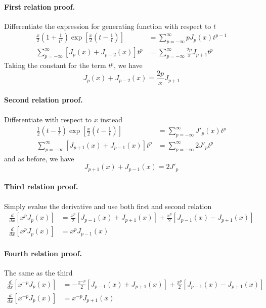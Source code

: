 \documentclass[../main.tex]{subfiles}
\begin{document}
\paragraph*{First relation proof.} Differentiate the expression for generating function with respect to $t$
\begin{align*}
    \frac{x}{2}\left(1+\frac{1}{t^2}\right)\exp\left[\frac{x}{2}\left(t-\frac{1}{t}\right)\right]&=\sum_{p=-\infty}^{\infty}pJ_p(x)t^{p-1}\\
    \sum_{p=-\infty}^{\infty}\left[J_p(x)+J_{p-2}(x)\right]t^p&= \sum_{p=-\infty}^{\infty}\frac{2p}{x}J_{p+1}t^{p}
\end{align*}
Taking the constant for the term $t^p$, we have 
\begin{equation*}
    J_p(x)+J_{p-2}(x)=\frac{2p}{x}J_{p+1} 
\end{equation*}

\paragraph*{Second relation proof.} Differentiate with respect to $x$ instead 
\begin{align*}
    \frac{1}{2}\left(t-\frac{1}{t}\right)\exp\left[\frac{x}{2}\left(t-\frac{1}{t}\right)\right]&=\sum_{p=-\infty}^{\infty}J'_p(x)t^{p}\\
    \sum_{p=-\infty}^{\infty}\left[J_{p+1}(x)+J_{p-1}(x)\right]t^p&= \sum_{p=-\infty}^{\infty}2J'_pt^{p}
\end{align*}
and as before, we have 
\begin{equation*}
    J_{p+1}(x)+J_{p-1}(x)=2J'_p
\end{equation*}

\paragraph*{Third relation proof.} Simply evalue the derivative and use both first and second relation
\begin{align*}
    \frac{d}{dx}\left[x^pJ_p(x)\right]&= \frac{x^p}{2}\left[J_{p-1}(x)+J_{p+1}(x)\right]+\frac{x^p}{2}\left[J_{p-1}(x)-J_{p+1}(x)\right]\\
    \frac{d}{dx}\left[x^pJ_p(x)\right]&=x^pJ_{p-1}(x)
\end{align*}

\paragraph*{Fourth relation proof.} The same as the third 
\begin{align*}
    \frac{d}{dx}\left[x^{-p}J_p(x)\right]&= -\frac{x^{-p}}{2}\left[J_{p-1}(x)+J_{p+1}(x)\right]+\frac{x^p}{2}\left[J_{p-1}(x)-J_{p+1}(x)\right]\\
    \frac{d}{dx}\left[x^{-p}J_p(x)\right]&=x^{-p}J_{p+1}(x)
\end{align*}
\end{document}
